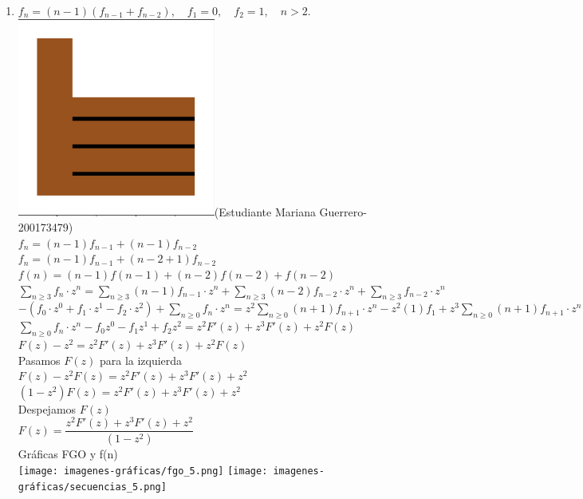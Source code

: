 \begin{enumerate}
    \item $f_n=(n-1)(f_{n-1}+f_{n-2}), \quad f_1=0,\quad f_2=1,\quad n> 2.$\\
        \vspace{2 mm}
        \includegraphics[width= 10 mm]{figures/exc.png}(Estudiante Mariana Guerrero- 200173479)\\
        $f_n = (n-1)f_{n-1}+(n-1)f_{n-2}$\\
        $f_n = (n-1)f_{n-1}+(n-2+1)f_{n-2}$\\
        $f(n) = (n-1)f(n-1)+(n-2)f(n-2)+ f(n-2)$\\
        $\sum_{n\geq3}f_n \cdot z^n = \sum_{n\geq3}(n-1)f_{n-1} \cdot z^n + \sum_{n\geq3}(n-2)f_{n-2} \cdot z^n + \sum_{n\geq3} f_{n-2} \cdot z^n$\\
        $-(f_0\cdot z^0+f_1\cdot z^1-f_2 \cdot z^2)+\sum_{n\ge0}f_n\cdot z^n =z^2\sum_{n\ge0}(n+1)f_{n+1} \cdot z^n-z^2(1)f_1+z^3\sum_{n\ge0}(n+1)f_{n+1} \cdot z^n + z^2 \sum_{n\ge0} f_n \cdot z^n$\\ 
        $\sum_{n\ge0}f_n\cdot z^n - f_0z^0 - f_1z^1 + f_2z^2 = z^2 F'(z) + z^3 F'(z) + z^2 F(z) $\\
        $F(z) - z^2 = z^2  F'(z) + z^3  F'(z) + z^2 F(z)$\\
        Pasamos $F(z)$ para la izquierda\\
        $F(z)-z^2F(z)= z^2  F'(z) + z^3  F'(z) + z^2 $\\
        $(1-z^2)F(z)= z^2  F'(z) + z^3  F'(z) + z^2 $\\
        Despejamos $F(z)$\\
        $F(z)= \dfrac{z^2 F'(z) + z^3 F'(z) + z^2}{(1-z^2)}$\\
    Gráficas FGO y f(n)\\
    \texttt{[image: imagenes-gráficas/fgo\_5.png]}
    \texttt{[image: imagenes-gráficas/secuencias\_5.png]}


\end{enumerate}
